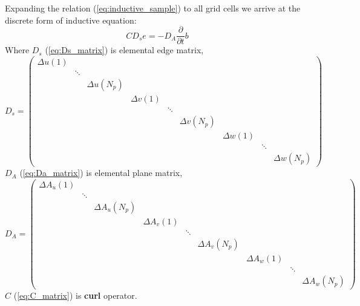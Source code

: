 Expanding the relation (\ref{eq:inductive_sample}) to all grid cells \cite{FIT_discrete_method}\cite{FIT_discrete_electrommagnetism}\cite{FIT_triangular_discretization}\cite{script_FeldSim} we arrive at the discrete form of inductive equation:
\begin{equation}
CD_{s}e=-D_{A}\frac{\partial}{\partial{t}}b
\label{eq:inductive_sample_all}
\end{equation}
Where $D_{s}$ (\ref{eq:Ds_matrix}) is elemental edge matrix,
\begin{equation}
D_{s}=
	\begin{pmatrix}
	\Delta u(1)&&&&&&&&\\
	&\ddots &&&&&&&\\
	&&\Delta u(N_{p})&&&&&&\\
	&&&\Delta v(1)&&&&&\\
	&&&&\ddots &&&&\\
	&&&&&\Delta v(N_{p})&&&\\
	&&&&&&\Delta w(1)&&\\
	&&&&&&&\ddots &\\
	&&&&&&&&\Delta w(N_{p})
	\end{pmatrix}
	\label{eq:Ds_matrix}
\end{equation}
$D_{A}$ (\ref{eq:Da_matrix}) is elemental plane matrix,
\begin{equation}
D_{A}=
	\begin{pmatrix}
	\Delta A_{u}(1)&&&&&&&&\\
	&\ddots &&&&&&&\\
	&&\Delta A_{u}(N_{p})&&&&&&\\
	&&&\Delta A_{v}(1)&&&&&\\
	&&&&\ddots &&&&\\
	&&&&&\Delta A_{v}(N_{p})&&&\\
	&&&&&&\Delta A_{w}(1)&&\\
	&&&&&&&\ddots &\\
	&&&&&&&&\Delta A_{w}(N_{p})
	\end{pmatrix}
	\label{eq:Da_matrix}
\end{equation}
$C$ (\ref{eq:C_matrix}) is \textbf{curl} operator.
